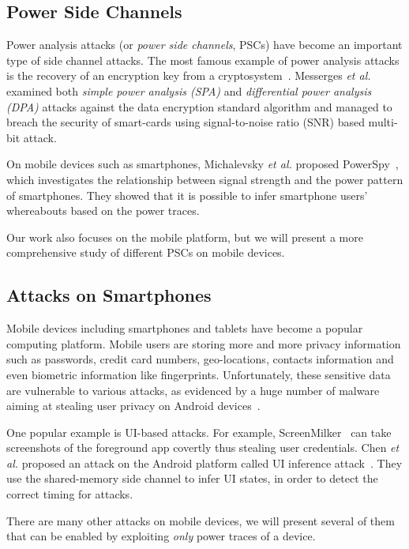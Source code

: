 \documentclass{sig-alternate}
\begin{document}
\subsection{Power Side Channels}
Power analysis attacks (or \emph{power side channels}, PSCs) have become an important type of side channel attacks. The most famous example of power analysis attacks is the recovery of an encryption key from a cryptosystem~\cite{kocher1999differential, kocher:introduction}. Messerges \emph{et al.}\cite{messerges2002examining} examined both \emph{simple power analysis (SPA)} and \emph{differential power analysis (DPA)} attacks against the data encryption standard algorithm and managed to breach the security of smart-cards using signal-to-noise ratio (SNR) based multi-bit attack.

On mobile devices such as smartphones, Michalevsky \emph{et al.} proposed PowerSpy~\cite{MichalevskyNSB15}, which investigates the relationship between signal strength and the power pattern of smartphones. They showed that it is possible to infer smartphone users' whereabouts based on the power traces.

Our work also focuses on the mobile platform, but we will present a more comprehensive study of different PSCs on mobile devices.


\subsection{Attacks on Smartphones}

Mobile devices including smartphones and tablets have become a popular computing platform. Mobile users are storing more and more privacy information such as passwords, credit card numbers, geo-locations, contacts information and even biometric information like fingerprints. Unfortunately, these sensitive data are vulnerable to various attacks, as evidenced by a huge number of malware aiming at stealing user privacy on Android devices~\cite{zhou2012dissecting}.

One popular example is UI-based attacks. For example, ScreenMilker~\cite{lin2014screenmilker}  can take screenshots of the foreground app covertly thus stealing user credentials.
Chen \emph{et al.} proposed an attack on the Android platform called UI inference attack~\cite{chen:2014}. They use the shared-memory side channel to infer UI states, in order to detect the correct timing for attacks.

There are many other attacks on mobile devices, we will present several of them that can be enabled by exploiting \emph{only} power traces of a device.
\end{document}
